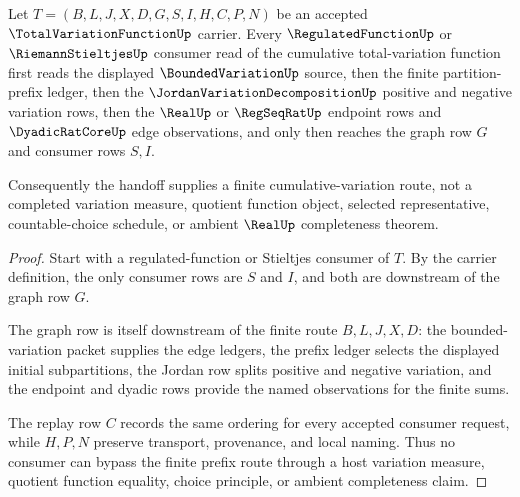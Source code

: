 \begin{theorem}
\label{thm:total-variation-function-regulated-handoff}
Let $T=(B,L,J,X,D,G,S,I,H,C,P,N)$ be an accepted $\TotalVariationFunctionUp$ carrier. Every $\RegulatedFunctionUp$ or $\RiemannStieltjesUp$ consumer read of the cumulative total-variation function first reads the displayed $\BoundedVariationUp$ source, then the finite partition-prefix ledger, then the $\JordanVariationDecompositionUp$ positive and negative variation rows, then the $\RealUp$ or $\RegSeqRatUp$ endpoint rows and $\DyadicRatCoreUp$ edge observations, and only then reaches the graph row $G$ and consumer rows $S,I$.

Consequently the handoff supplies a finite cumulative-variation route, not a completed variation measure, quotient function object, selected representative, countable-choice schedule, or ambient $\RealUp$ completeness theorem.
\end{theorem}
\begin{proof}
Start with a regulated-function or Stieltjes consumer of $T$. By the carrier definition, the only consumer rows are $S$ and $I$, and both are downstream of the graph row $G$.

The graph row is itself downstream of the finite route $B,L,J,X,D$: the bounded-variation packet supplies the edge ledgers, the prefix ledger selects the displayed initial subpartitions, the Jordan row splits positive and negative variation, and the endpoint and dyadic rows provide the named observations for the finite sums.

The replay row $C$ records the same ordering for every accepted consumer request, while $H,P,N$ preserve transport, provenance, and local naming. Thus no consumer can bypass the finite prefix route through a host variation measure, quotient function equality, choice principle, or ambient completeness claim.
\end{proof}


